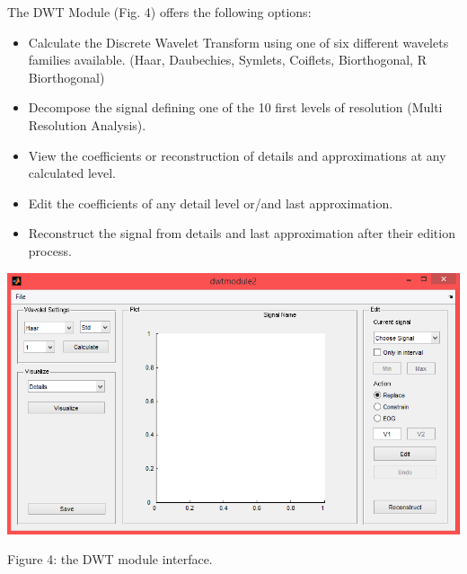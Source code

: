 \documentclass[12pt, a4paper]{article}
\begin{document}
The DWT Module (Fig. 4) offers the following options:
\begin{itemize}
\item Calculate the Discrete Wavelet Transform using one of six different wavelets families available. (Haar, Daubechies, Symlets, Coiflets, Biorthogonal, R Biorthogonal)
\item Decompose the signal defining one of the 10 first levels of resolution (Multi Resolution Analysis).
\item View the coefficients or reconstruction of details and approximations at any calculated level.
\item Edit the coefficients of any detail level or/and last approximation.
\item Reconstruct the signal from details and last approximation after their edition process.
\end{itemize}
\begin{center}
\includegraphics[width=15cm]{dwt2.png}

Figure 4: the DWT module interface.
\end{center}
\end{document}
